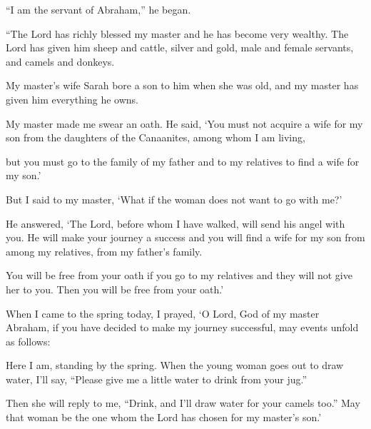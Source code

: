 \begin{scripture}
 ``I am the servant of Abraham,'' he began.
 ``The Lord has richly blessed my master and he has become very wealthy. The Lord has given him sheep and cattle, silver and gold, male and female servants, and camels and donkeys.
 My master's wife Sarah bore a son to him when she was old, and my master has given him everything he owns.
 My master made me swear an oath. He said, `You must not acquire a wife for my son from the daughters of the Canaanites, among whom I am living,
 but you must go to the family of my father and to my relatives to find a wife for my son.'
 But I said to my master, `What if the woman does not want to go with me?'
 He answered, `The Lord, before whom I have walked, will send his angel with you. He will make your journey a success and you will find a wife for my son from among my relatives, from my father's family.
 You will be free from your oath if you go to my relatives and they will not give her to you. Then you will be free from your oath.'
 When I came to the spring today, I prayed, `O Lord, God of my master Abraham, if you have decided to make my journey successful, may events unfold as follows:
 Here I am, standing by the spring. When the young woman goes out to draw water, I'll say, ``Please give me a little water to drink from your jug.''
 Then she will reply to me, ``Drink, and I'll draw water for your camels too.'' May that woman be the one whom the Lord has chosen for my master's son.'
\everypar{}


\end{scripture}
